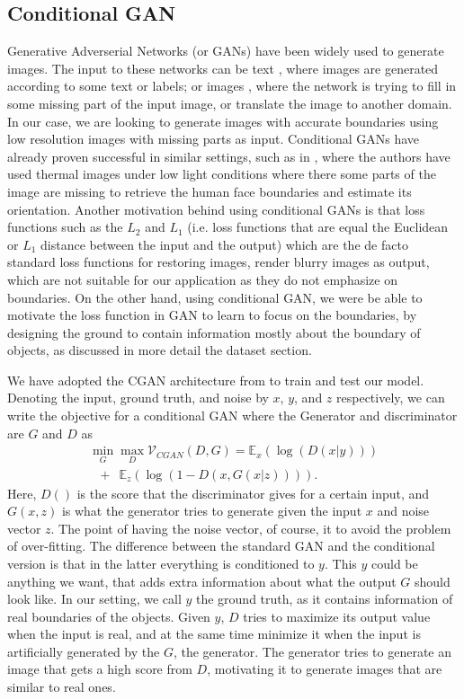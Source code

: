 \subsection{Conditional GAN} \label{cGAN}
Generative Adverserial Networks (or GANs) \cite{GAN} have been widely used to generate images. The input to these networks can be text \cite{text2pix, text2pix2}, where images are generated according to some text or labels; or images \cite{pix2pix, cGANberkeley, TV-GAN, deraning}, where the network is trying to fill in some missing part of the input image, or translate the image to another domain. In our case, we are looking to generate images with accurate boundaries using low resolution images with missing parts as input. Conditional GANs have already proven successful in similar settings, such as in \cite{hams, TV-GAN}, where the authors have used thermal images under low light conditions where there some parts of the image are missing to retrieve the human face boundaries and estimate its orientation. Another motivation behind using conditional GANs is that loss functions such as the $L_2$ and $L_1$ (i.e. loss functions that are equal the Euclidean or $L_1$ distance between the input and the output) which are the de facto standard loss functions for restoring images, render blurry images as output, which are not suitable for our application as they do not emphasize on boundaries. On the other hand, using conditional GAN, we were be able to motivate the loss function in GAN to learn to focus on the boundaries, by designing the ground to contain information mostly about the boundary of objects, as discussed in more detail the dataset section.

We have adopted the CGAN architecture from \cite{pix2pix} to train and test our model. Denoting the input, ground truth, and noise by $x$, $y$, and $z$ respectively, we can write the objective for a conditional GAN where the Generator and discriminator are $G$ and $D$ as
\begin{equation}
\begin{array}{l}
\min_G \max_D \mathcal{V}_{CGAN}(D,G) = \mathbb{E}_{x}(\log(D(x|y)))\\
\, \, \, \,+ \, \, \, \mathbb{E}_{z}(\log(1-D(x,G(x|z)))).
\end{array}
\end{equation}
Here, $D()$ is the score that the discriminator gives for a certain input, and $G(x,z)$ is what the generator tries to generate given the input $x$ and noise vector $z$. The point of having the noise vector, of course, it to avoid the problem of over-fitting. The difference between the standard GAN and the conditional version is that in the latter everything is conditioned to $y$. This $y$ could be anything we want, that adds extra information about what the output $G$ should look like. In our setting, we call $y$ the ground truth, as it contains information of real boundaries of the objects. Given $y$, $D$ tries to maximize its output value when the input is real, and at the same time minimize it when the input is artificially generated by the $G$, the generator. The generator tries to generate an image that gets a high score from $D$, motivating it to generate images that are similar to real ones.

